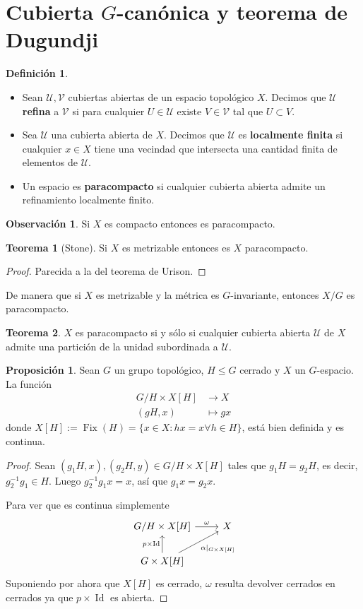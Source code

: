 \documentclass[spanish]{article}
\theoremstyle{definition}
\newtheorem*{defn}{Definición}
\newtheorem*{obs}{Observación}
\newtheorem*{teo}{Teorema}
\newtheorem*{prop}{Proposición}
\DeclareMathOperator{\Id}{Id}
\begin{document}
\section{Cubierta $G$-canónica y teorema de Dugundji}
\begin{defn}\leavevmode
	\begin{itemize}
		\item Sean $\mathcal{U},\mathcal{V}$ cubiertas abiertas de un espacio topológico $X$. Decimos que $\mathcal{U}$ \textbf{refina} a $\mathcal{V}$ si para cualquier $U\in \mathcal{U}$ existe $V\in \mathcal{V}$ tal que $U\subset V$.
		\item Sea $\mathcal{U}$ una cubierta abierta de $X$. Decimos que $\mathcal{U}$ es \textbf{localmente finita} si cualquier $x\in X$ tiene una vecindad que intersecta una cantidad finita de elementos de $\mathcal{U}$.
		\item Un espacio es \textbf{paracompacto} si cualquier cubierta abierta admite un refinamiento localmente finito.
	\end{itemize}
\end{defn}
\begin{obs}
	Si $X$ es compacto entonces es paracompacto.
\end{obs}
\begin{teo}[Stone]
	Si $X$ es metrizable entonces es $X$ paracompacto.
\end{teo}
\begin{proof}
	Parecida a la del teorema de Urison.
\end{proof}
De manera que si $X$ es metrizable y la métrica es $G$-invariante, entonces $X/G$ es paracompacto.

\begin{teo}
	$X$ es paracompacto si y sólo si cualquier cubierta abierta $\mathcal{U}$ de $X$ admite una partición de la unidad subordinada a $\mathcal{U}$.
\end{teo}

\begin{prop}
	Sean $G$ un grupo topológico, $H\leq G$ cerrado y $X$ un $G$-espacio. La función 
	\begin{align*}
		G/H\times X[H]&\to X\\
		(gH,x)\quad&\mapsto gx
	\end{align*}
	donde $X[H]:=\operatorname{Fix}(H)=\{x\in X:hx=x\forall h\in H\}$, está bien definida y es continua.
\end{prop}
\begin{proof}
	Sean $(g_1H,x),(g_2H,y)\in G/H\times X[H]$ tales que $g_1H=g_2H$, es decir, $g_2^{-1}g_1\in H$. Luego $g_2^{-1}g_1x=x$, así que $g_1x=g_2x$.
	
	Para ver que es continua simplemente
	\[\begin{tikzcd}
		G/H\times X[H]\arrow[r,"\omega"]&X\\
		G\times X[H]\arrow[swap,ur,"\alpha|_{G\times X[H]}"]\arrow[u,"p\times\Id"]
	\end{tikzcd}\]
	Suponiendo por ahora que $X[H]$ es cerrado, $\omega$ resulta devolver cerrados en cerrados ya que $p\times\Id$ es abierta.
\end{proof}
\end{document}
